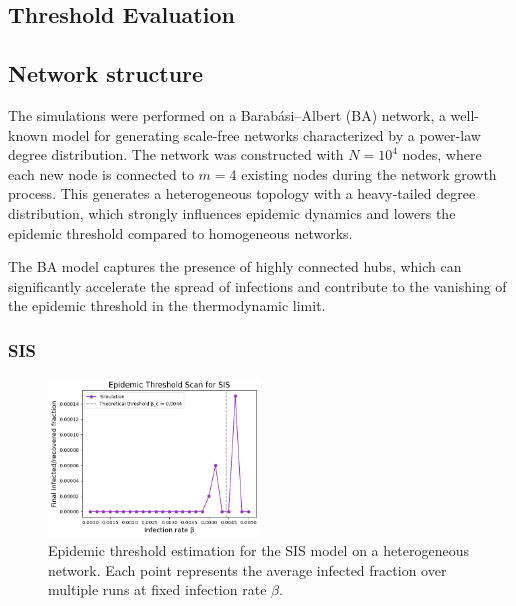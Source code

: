 \subsection{Threshold Evaluation}
\label{app:Thresholds}
\subsection*{Network structure}

The simulations were performed on a Barabási–Albert (BA) network, a well-known model for generating scale-free networks characterized by a power-law degree distribution. The network was constructed with \( N = 10^4 \) nodes, where each new node is connected to \( m = 4 \) existing nodes during the network growth process. This generates a heterogeneous topology with a heavy-tailed degree distribution, which strongly influences epidemic dynamics and lowers the epidemic threshold compared to homogeneous networks.

The BA model captures the presence of highly connected hubs, which can significantly accelerate the spread of infections and contribute to the vanishing of the epidemic threshold in the thermodynamic limit.

\subsubsection{SIS}
\begin{figure}[H]
    \centering
    \includegraphics[width=0.5\textwidth]{images/Heterogeneous/SIS_thresholds.png}
    \caption{Epidemic threshold estimation for the SIS model on a heterogeneous network. Each point represents the average infected fraction over multiple runs at fixed infection rate $\beta$.}
    \label{fig:SIS_threshold_heterogeneous}
\end{figure}

